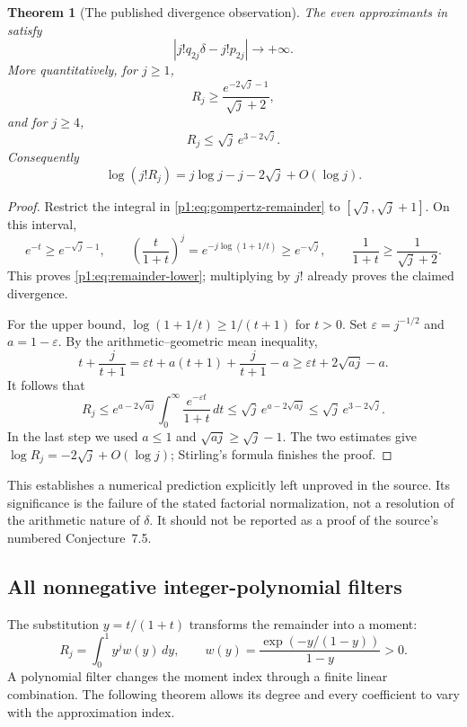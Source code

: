 \documentclass[11pt,a4paper]{article}
\newtheorem{theorem}{Theorem}[section]
\theoremstyle{definition}
\theoremstyle{remark}
\numberwithin{equation}{section}
\begin{document}
\begin{theorem}[The published divergence observation]
\label{p1:thm:my-divergence}
The even approximants in \cite{p1:MurabayashiYoshida2024} satisfy
\[
 \left|j!q_{2j}\delta-j!p_{2j}\right|\longrightarrow+\infty.
\]
More quantitatively, for $j\geq1$,
\begin{equation}\label{p1:eq:remainder-lower}
 R_j\geq\frac{e^{-2\sqrt j-1}}{\sqrt j+2},
\end{equation}
and for $j\geq4$,
\begin{equation}\label{p1:eq:remainder-upper}
 R_j\leq\sqrt j\,e^{3-2\sqrt j}.
\end{equation}
Consequently
\[
 \log(j!R_j)=j\log j-j-2\sqrt j+O(\log j).
\]
\end{theorem}
\begin{proof}
Restrict the integral in \eqref{p1:eq:gompertz-remainder} to
$[\sqrt j,\sqrt j+1]$. On this interval,
\[
 e^{-t}\geq e^{-\sqrt j-1},\qquad
 \left(\frac{t}{1+t}\right)^j
 =e^{-j\log(1+1/t)}\geq e^{-\sqrt j},\qquad
 \frac1{1+t}\geq\frac1{\sqrt j+2}.
\]
This proves \eqref{p1:eq:remainder-lower}; multiplying by $j!$ already
proves the claimed divergence.

For the upper bound, $\log(1+1/t)\geq1/(t+1)$ for $t>0$.
Set $\varepsilon=j^{-1/2}$ and $a=1-\varepsilon$. By the
arithmetic--geometric mean inequality,
\[
 t+\frac j{t+1}
 =\varepsilon t+a(t+1)+\frac j{t+1}-a
 \geq\varepsilon t+2\sqrt{aj}-a.
\]
It follows that
\[
 R_j\leq e^{a-2\sqrt{aj}}
       \int_0^\infty\frac{e^{-\varepsilon t}}{1+t}\,dt
 \leq\sqrt j\,e^{a-2\sqrt{aj}}
 \leq\sqrt j\,e^{3-2\sqrt j}.
\]
In the last step we used $a\leq1$ and
$\sqrt{aj}\geq\sqrt j-1$. The two estimates give
$\log R_j=-2\sqrt j+O(\log j)$; Stirling's formula finishes the proof.
\end{proof}

This establishes a numerical prediction explicitly left unproved in
the source. Its significance is the failure of the stated factorial
normalization, not a resolution of the arithmetic nature of $\delta$.
It should not be reported as a proof of the source's numbered
Conjecture~7.5.

\subsection{All nonnegative integer-polynomial filters}

The substitution $y=t/(1+t)$ transforms the remainder into a moment:
\begin{equation}\label{p1:eq:gompertz-moments}
 R_j=\int_0^1 y^j w(y)\,dy,
 \qquad
 w(y)=\frac{\exp(-y/(1-y))}{1-y}>0.
\end{equation}
A polynomial filter changes the moment index through a finite linear
combination. The following theorem allows its degree and every
coefficient to vary with the approximation index.
\end{document}
